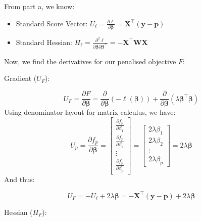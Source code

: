 \documentclass[12pt,halfline,a4paper,]{ouparticle}
\begin{document}
From part a, we know:

\begin{itemize}
  \item Standard Score Vector: $U_{\ell} = \frac{\partial \ell}{\partial \boldsymbol{\beta}} = \mathbf{X}^\top (\mathbf{y} - \mathbf{p})$

  \item Standard Hessian: $H_{\ell} = \frac{\partial^2 \ell}{\partial \boldsymbol{\beta} \partial \boldsymbol{\beta}^\top} = -\mathbf{X}^\top \mathbf{W} \mathbf{X}$

\end{itemize}

Now, we find the derivatives for our penalised objective \(F\):

Gradient (\(U_F\)):

\[U_F = \frac{\partial F}{\partial \boldsymbol{\beta}} = \frac{\partial}{\partial \boldsymbol{\beta}}(-\ell(\boldsymbol{\beta})) + \frac{\partial}{\partial \boldsymbol{\beta}}(\lambda \boldsymbol{\beta}^\top \boldsymbol{\beta})\]
Using denominator layout for matrix calculus, we have: \[
U_p = \frac{\partial f_p}{\partial \boldsymbol{\beta}} =
  \begin{bmatrix}
  \frac{\partial f_p}{\partial \beta_1} \\
  \frac{\partial f_p}{\partial \beta_2} \\
  \vdots \\
  \frac{\partial f_p}{\partial \beta_p}
  \end{bmatrix}
  =
  \begin{bmatrix}
  2\lambda\beta_1 \\
  2\lambda\beta_2 \\
  \vdots \\
  2\lambda\beta_p
  \end{bmatrix}
  = 2\lambda\boldsymbol{\beta}
\] And thus:

\[U_F = -U_{\ell} + 2\lambda\boldsymbol{\beta} = -\mathbf{X}^\top (\mathbf{y} - \mathbf{p}) + 2\lambda\boldsymbol{\beta}\]

Hessian (\(H_F\)):
\end{document}

